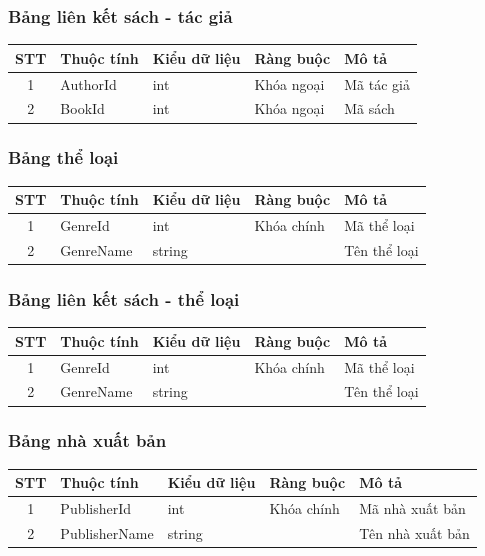 \documentclass[12pt]{report}
\begin{document}
            \subsubsection{Bảng liên kết sách - tác giả}
                \begin{tabular}{|c|l|l|l|l|}
                    \hline
                    \textbf{STT} & \textbf{Thuộc tính} & \textbf{Kiểu dữ liệu} & \textbf{Ràng buộc} & \textbf{Mô tả} \\ \hline
                    1 & AuthorId & int & Khóa ngoại & Mã tác giả \\ \hline
                    2 & BookId & int & Khóa ngoại & Mã sách \\ \hline
                \end{tabular}
            \subsubsection{Bảng thể loại}
                \begin{tabular}{|c|l|l|l|l|}
                    \hline
                    \textbf{STT} & \textbf{Thuộc tính} & \textbf{Kiểu dữ liệu} & \textbf{Ràng buộc} & \textbf{Mô tả} \\ \hline
                    1 & GenreId & int & Khóa chính & Mã thể loại \\ \hline
                    2 & GenreName & string & & Tên thể loại \\ \hline
                \end{tabular}
            \subsubsection{Bảng liên kết sách - thể loại}
                \begin{tabular}{|c|l|l|l|l|}
                    \hline
                    \textbf{STT} & \textbf{Thuộc tính} & \textbf{Kiểu dữ liệu} & \textbf{Ràng buộc} & \textbf{Mô tả} \\ \hline
                    1 & GenreId & int & Khóa chính & Mã thể loại \\ \hline
                    2 & GenreName & string & & Tên thể loại \\ \hline
                \end{tabular}
            \subsubsection{Bảng nhà xuất bản}
                \begin{tabular}{|c|l|l|l|l|}
                    \hline
                    \textbf{STT} & \textbf{Thuộc tính} & \textbf{Kiểu dữ liệu} & \textbf{Ràng buộc} & \textbf{Mô tả} \\ \hline
                    1 & PublisherId & int & Khóa chính & Mã nhà xuất bản \\ \hline
                    2 & PublisherName & string & & Tên nhà xuất bản \\ \hline
                \end{tabular}
\end{document}
